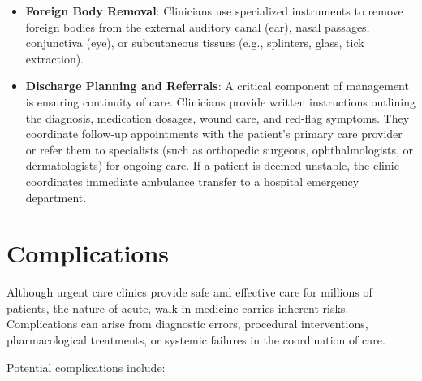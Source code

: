 \begin{itemize}
  \item \textbf{Foreign Body Removal}: Clinicians use specialized instruments to remove foreign bodies from the external auditory canal (ear), nasal passages, conjunctiva (eye), or subcutaneous tissues (e.g., splinters, glass, tick extraction).
  \item \textbf{Discharge Planning and Referrals}: A critical component of management is ensuring continuity of care. Clinicians provide written instructions outlining the diagnosis, medication dosages, wound care, and red-flag symptoms. They coordinate follow-up appointments with the patient's primary care provider or refer them to specialists (such as orthopedic surgeons, ophthalmologists, or dermatologists) for ongoing care. If a patient is deemed unstable, the clinic coordinates immediate ambulance transfer to a hospital emergency department.
\end{itemize}

\section*{Complications}
Although urgent care clinics provide safe and effective care for millions of patients, the nature of acute, walk-in medicine carries inherent risks. Complications can arise from diagnostic errors, procedural interventions, pharmacological treatments, or systemic failures in the coordination of care.

Potential complications include:

